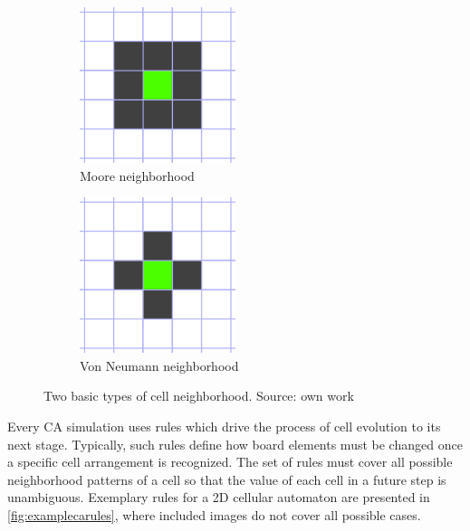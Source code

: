 \documentclass[12pt]{report}
\begin{document}
\begin{figure}[H]
	\centering
	\begin{subfigure}[t]{0.4\textwidth}
		\centering
		\includegraphics[width=0.5\textwidth]{images/neighborsmoore}
		\caption{Moore neighborhood} 
	\end{subfigure} \hspace{1em}
	\hfill
	\begin{subfigure}[t]{0.4\textwidth}
		\centering
		\includegraphics[width=0.5\textwidth]{images/neighborsvonneumann}
		\caption{Von Neumann neighborhood} 
	\end{subfigure} \hspace{1em} 
	\caption{Two basic types of cell neighborhood. Source: own work}
	\label{fig:neighborhood_types}
\end{figure}


Every CA simulation uses rules which drive the process of cell evolution to its next stage. Typically, such rules define how board elements must be changed once a specific cell arrangement is recognized. The set of rules must cover all possible neighborhood patterns of a cell so that the value of each cell in a future step is unambiguous. Exemplary rules for a 2D cellular automaton are presented in  \cref{fig:examplecarules}, where included images do not cover all possible cases.
\end{document}
